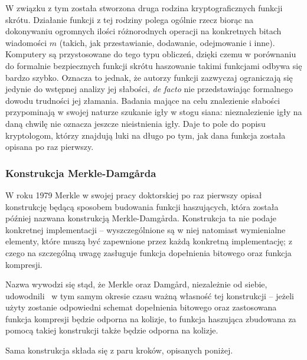 \documentclass[12pt,a4paper,twoside]{article}
\begin{document}
W związku z tym została stworzona druga rodzina kryptograficznych funkcji
skrótu. Działanie funkcji z tej rodziny polega ogólnie rzecz biorąc na
dokonywaniu ogromnych ilości różnorodnych operacji na konkretnych bitach
wiadomości $m$ (takich, jak przestawianie, dodawanie, odejmowanie i inne).
Komputery są przystosowane do tego typu obliczeń, dzięki czemu w porównaniu do
formalnie bezpiecznych funkcji skrótu haszowanie takimi funkcjami odbywa się
bardzo szybko. Oznacza to jednak, że autorzy funkcji zazwyczaj ograniczają się
jedynie do wstępnej analizy jej słabości, \textit{de facto} nie przedstawiając
formalnego dowodu trudności jej złamania. Badania mające na celu znalezienie
słabości przypominają w swojej naturze szukanie igły w stogu siana:
nieznalezienie igły na daną chwilę nie oznacza jeszcze nieistnienia igły. Daje
to pole do popisu kryptologom, którzy znajdują luki na długo po tym, jak dana
funkcja została opisana po raz pierwszy.

\subsubsection{Konstrukcja Merkle-Damg\r{a}rda}
W roku 1979 Merkle w swojej pracy doktorskiej po raz pierwszy opisał
konstrukcję będącą sposobem budowania funkcji haszujących, która została
później nazwana konstrukcją Merkle-Damg\r{a}rda. Konstrukcja ta nie podaje
konkretnej implementacji -- wyszczególnione są w niej natomiast wymienialne
elementy, które muszą być zapewnione przez każdą konkretną implementację; z
czego na szczególną uwagę zasługuje funkcja dopełnienia bitowego oraz funkcja
kompresji.

Nazwa wywodzi się stąd, że Merkle oraz Damg\r{a}rd, niezależnie od siebie,
udowodnili~\cite{merkledamgardsecurity1,merkledamgardsecurity2} w tym samym
okresie czasu ważną własność tej konstrukcji -- jeżeli użyty zostanie
odpowiedni schemat dopełnienia bitowego oraz zastosowana funkcja kompresji
będzie odporna na kolizje, to funkcja haszująca zbudowana za pomocą takiej
konstrukcji także będzie odporna na kolizje.

Sama konstrukcja składa się z paru kroków, opisanych poniżej.
\end{document}
